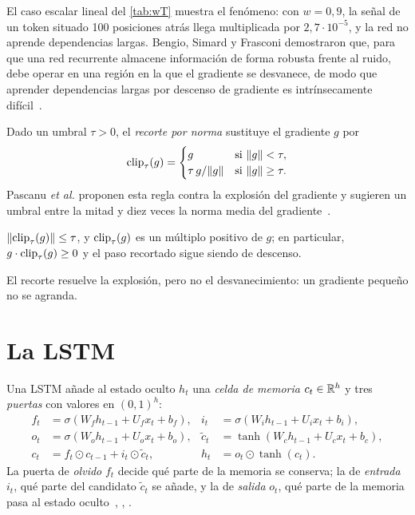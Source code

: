 El caso escalar lineal del \cref{tab:wT} muestra el fenómeno: con $w=0{,}9$, la señal de un token situado 100 posiciones atrás llega multiplicada por $2{,}7\cdot 10^{-5}$, y la red no aprende dependencias largas. Bengio, Simard y Frasconi demostraron que, para que una red recurrente almacene información de forma robusta frente al ruido, debe operar en una región en la que el gradiente se desvanece, de modo que aprender dependencias largas por descenso de gradiente es intrínsecamente difícil~\cite{bengio94}.

\begin{definicion}
Dado un umbral $\tau>0$, el \emph{recorte por norma} sustituye el gradiente $g$ por
\[
\operatorname{clip}_{\tau}(g)=\begin{cases} g & \text{si } \lVert g\rVert<\tau,\\ \tau\,g/\lVert g\rVert & \text{si } \lVert g\rVert\ge\tau.\end{cases}
\]
Pascanu \emph{et al.} proponen esta regla contra la explosión del gradiente y sugieren un umbral entre la mitad y diez veces la norma media del gradiente~\cite[§3.2]{pascanu}.
\end{definicion}

\begin{proposicion}\label{prop:clip}
$\lVert\operatorname{clip}_{\tau}(g)\rVert\le\tau$, y $\operatorname{clip}_{\tau}(g)$ es un múltiplo positivo de $g$; en particular, $g\cdot\operatorname{clip}_{\tau}(g)\ge 0$ y el paso recortado sigue siendo de descenso.
\end{proposicion}

El recorte resuelve la explosión, pero no el desvanecimiento: un gradiente pequeño no se agranda.

\section{La LSTM}

\begin{definicion}[LSTM]\label{def:lstm}
Una LSTM añade al estado oculto $h_t$ una \emph{celda de memoria} $c_t\in\mathbb{R}^{h}$ y tres \emph{puertas} con valores en $(0,1)^{h}$:
\[
\begin{aligned}
f_t&=\sigma(W_f h_{t-1}+U_f x_t+b_f), & i_t&=\sigma(W_i h_{t-1}+U_i x_t+b_i),\\
o_t&=\sigma(W_o h_{t-1}+U_o x_t+b_o), & \tilde c_t&=\tanh(W_c h_{t-1}+U_c x_t+b_c),\\
c_t&=f_t\odot c_{t-1}+i_t\odot\tilde c_t, & h_t&=o_t\odot\tanh(c_t).
\end{aligned}
\]
La puerta de \emph{olvido} $f_t$ decide qué parte de la memoria se conserva; la de \emph{entrada} $i_t$, qué parte del candidato $\tilde c_t$ se añade, y la de \emph{salida} $o_t$, qué parte de la memoria pasa al estado oculto~\cite{lstm}, \cite[§14.5]{jm3}, \cite[§10.1]{d2l}.
\end{definicion}

